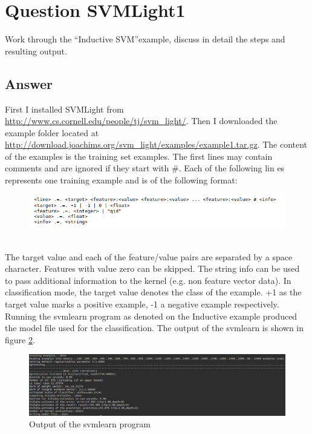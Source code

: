 \documentclass{article}
\begin{document}
\section*{Question SVMLight1}
Work through the ``Inductive SVM''example, discuss in detail the steps and resulting output.
\subsection*{Answer}

First I installed SVMLight from \url{http://www.cs.cornell.edu/people/tj/svm_light/}. Then I downloaded the example folder located at \url{http://download.joachims.org/svm_light/examples/example1.tar.gz}. The content of the examples is the training set examples. The first lines may contain comments and are ignored if they start with \#. Each of the following lin
es represents one training example and is of the following format:
	\begin{figure}[h]
			\centering
			\includegraphics[width=\linewidth]{training_example.png}
		
			\label{fig:training_example}
	\end{figure}
\\The target value and each of the feature/value pairs are separated by a space character. Features with value zero can be skipped. The string info can be used to pass additional information to the kernel (e.g. non feature vector data).
In classification mode, the target value denotes the class of the example. +1 as the target value marks a positive example, -1 a negative example respectively.\\
Running the svm\textunderscore learn program as denoted on the Inductive example produced the model file used for the classification. The output of the svm\textunderscore learn is shown in figure \ref{fig:SVM_learn}.
	\begin{figure}[h]
			\centering
			\includegraphics[width=\linewidth]{svm_learn.png}
			\caption{Output of the svm\textunderscore learn program}
			\label{fig:SVM_learn}
	\end{figure}
\end{document}
